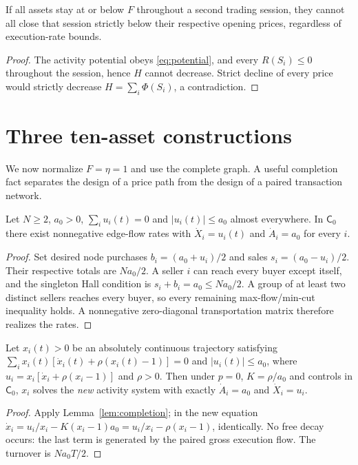 \documentclass[review,hidelinks,onefignum,onetabnum]{siamonline250211}%
\begin{document}
\begin{proposition}\label{prop:second}
If all assets stay at or below $F$ throughout a second trading session,
they cannot all close that session strictly below their respective
opening prices, regardless of execution-rate bounds.
\end{proposition}
\begin{proof}
The activity potential obeys \eqref{eq:potential}, and every
$R(S_i)\le0$ throughout the session, hence $H$ cannot decrease.
Strict decline of every price would strictly decrease
$H=\sum_i\Phi(S_i)$, a contradiction.
\end{proof}

\section{Three ten-asset constructions}\label{sec:examples}
We now normalize $F=\eta=1$ and use the complete graph. A useful
completion fact separates the design of a price path from the design
of a paired transaction network.
\begin{lemma}\label{lem:completion}
Let $N\ge2$, $a_0>0$, $\sum_iu_i(t)=0$ and
$|u_i(t)|\le a_0$ almost everywhere. In $\mathsf C_0$ there exist
nonnegative edge-flow rates with
$\dot X_i=u_i(t)$ and $\dot A_i=a_0$ for every $i$.
\end{lemma}
\begin{proof}
Set desired node purchases $b_i=(a_0+u_i)/2$ and sales
$s_i=(a_0-u_i)/2$. Their respective totals are $Na_0/2$.
A seller $i$ can reach every buyer except itself, and the singleton
Hall condition is $s_i+b_i=a_0\le Na_0/2$. A group of at least
two distinct sellers reaches every buyer, so every remaining
max-flow/min-cut inequality holds. A nonnegative zero-diagonal
transportation matrix therefore realizes the rates.
\end{proof}

\begin{lemma}\label{lem:embed}
Let $x_i(t)>0$ be an absolutely continuous trajectory satisfying
$\sum_i x_i(t)[\dot x_i(t)+\rho(x_i(t)-1)]=0$ and
$|u_i(t)|\le a_0$, where
$u_i=x_i[\dot x_i+\rho(x_i-1)]$ and $\rho>0$.
Then under $p=0$, $K=\rho/a_0$ and controls in $\mathsf C_0$,
$x_i$ solves the \emph{new} activity system with exactly
$\dot A_i=a_0$ and $\dot X_i=u_i$.
\end{lemma}
\begin{proof}
Apply Lemma~\ref{lem:completion}; in the new equation
$\dot x_i=u_i/x_i-K(x_i-1)a_0
=u_i/x_i-\rho(x_i-1)$, identically.
No free decay occurs: the last term is generated by the paired
gross execution flow. The turnover is $Na_0T/2$.
\end{proof}
\end{document}
